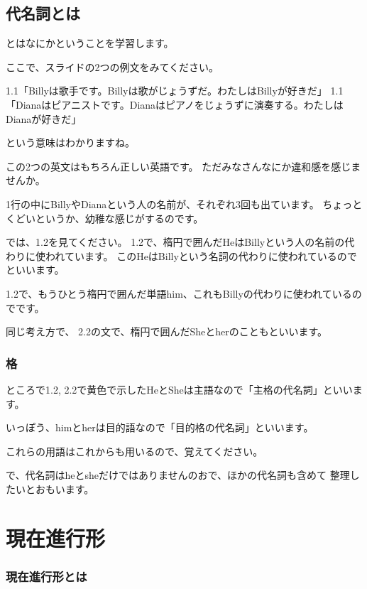 \documentclass[book,jafontscale=0.9247]{jlreq}
\begin{document}
\section{代名詞とは}

とはなにかということを学習します。

ここで、スライドの2つの例文をみてください。

1.1「Billyは歌手です。Billyは歌がじょうずだ。わたしはBillyが好きだ」
1.1「Dianaはピアニストです。Dianaはピアノをじょうずに演奏する。わたしはDianaが好きだ」

という意味はわかりますね。

この2つの英文はもちろん正しい英語です。
ただみなさんなにか違和感を感じませんか。

1行の中にBillyやDianaという人の名前が、それぞれ3回も出ています。
ちょっとくどいというか、幼稚な感じがするのです。

では、1.2を見てください。
1.2で、楕円で囲んだHeはBillyという人の名前の代わりに使われています。
このHeはBillyという名詞の代わりに使われているのでといいます。

1.2で、もうひとう楕円で囲んだ単語him、これもBillyの代わりに使われているのでです。

同じ考え方で、
2.2の文で、楕円で囲んだSheとherのこともといいます。

\subsection{格}

ところで1.2, 2.2で黄色で示したHeとSheは主語なので「主格の代名詞」といいます。

いっぽう、himとherは目的語なので「目的格の代名詞」といいます。

これらの用語はこれからも用いるので、覚えてください。

で、代名詞はheとsheだけではありませんのおで、ほかの代名詞も含めて
整理したいとおもいます。





\chapter{現在進行形}
\subsection{現在進行形とは}
\end{document}
